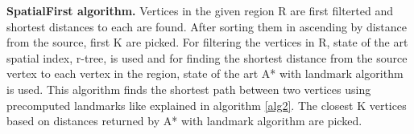 \textbf{SpatialFirst algorithm. } Vertices in the given region R are first filterted and shortest distances to each are found. After sorting them in ascending by distance from the source, first K are picked. For filtering the vertices in R, state of the art spatial index, r-tree, is used and for finding the shortest distance from the source vertex to each vertex in the region, state of the art A* with landmark algorithm~\cite{AC2005} is used. This algorithm finds the shortest path between two vertices using precomputed landmarks like explained in algorithm \ref{alg2}. The closest K vertices based on distances returned by A* with landmark algorithm are picked. 





